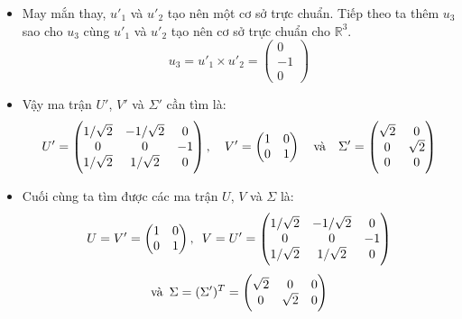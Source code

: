 \documentclass[a4paper, 12pt]{report}
\begin{document}
\begin{itemize}
    \item May mắn thay, $u'_1$ và $u'_2$ tạo nên một cơ sở trực chuẩn. Tiếp theo ta thêm $u_3$ sao cho $u_3$ cùng $u'_1$ và $u'_2$ tạo nên cơ sở trực chuẩn cho $\mathbb{R}^3$.
    $$
    u_3 = u'_1 \times u'_2 
    = \begin{pmatrix}
    0 \\        
    -1 \\
    0
    \end{pmatrix}
    $$

    \item Vậy ma trận $U'$, $V'$ và $\Sigma'$ cần tìm là:
    $$
    U' =
    \begin{pmatrix}
        1/\sqrt{2} & -1/\sqrt{2} & 0 \\
        0 & 0 & -1 \\
        1/\sqrt{2} & 1/\sqrt{2} & 0
    \end{pmatrix},
    \hspace*{10pt}
    V' = 
    \begin{pmatrix}
        1 & 0 \\
        0 & 1
    \end{pmatrix}
    \hspace*{10pt}
    \text{và}
    \hspace*{10pt}
    \Sigma' = 
    \begin{pmatrix}
        \sqrt{2} & 0 \\
        0 & \sqrt{2} \\
        0 & 0 
    \end{pmatrix}
    $$

    \item Cuối cùng ta tìm được các ma trận $U$, $V$ và $\Sigma$ là:
    $$
    U = V' = 
    \begin{pmatrix}
        1 & 0 \\
        0 & 1
    \end{pmatrix},
    \hspace*{5pt}
    V = U' =
    \begin{pmatrix}
        1/\sqrt{2} & -1/\sqrt{2} & 0 \\
        0 & 0 & -1 \\
        1/\sqrt{2} & 1/\sqrt{2} & 0
    \end{pmatrix} 
    $$
    $$
    \text{và} \hspace*{5pt}
    \Sigma = (\Sigma')^T =
    \begin{pmatrix}
        \sqrt{2} & 0 & 0 \\
        0 & \sqrt{2} & 0 \\
    \end{pmatrix}
    $$
\end{itemize}
\end{document}
